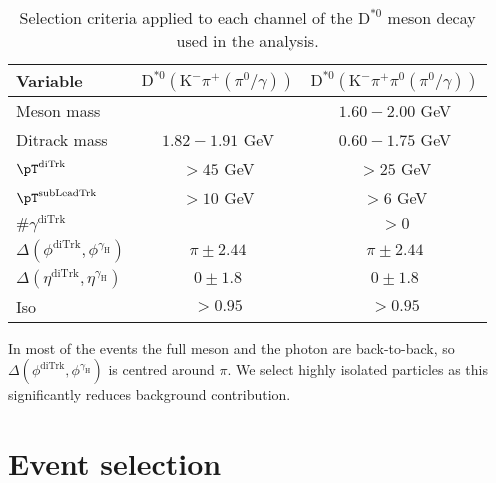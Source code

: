\begin{table}[!ht]
    \centering
    \begin{tabular}{|l|c|c|}
        \hline
        \cellcolor{lightgray}Variable & \cellcolor{lightgray}$\text{D}^{*0}(\text{K}^{-}\pi^{+}{\scriptstyle(\pi^{0}/\gamma)})$ & \cellcolor{lightgray}$\text{D}^{*0}(\text{K}^{-}\pi^{+}\pi^{0}{\scriptstyle(\pi^{0}/\gamma)})$ \\ \hline
        Meson mass                                              &                   &$1.60-2.00$ GeV  \\
        Ditrack mass                                            &$1.82-1.91$ GeV    &$0.60-1.75$ GeV  \\
        $\pT^{\text{diTrk}}$                                    &$>45$ GeV          &$>25$ GeV           \\
        $\pT^{\text{subLeadTrk}}$                               &$>10$ GeV          &$>6$ GeV           \\
        $\#\gamma^{\text{diTrk}}$                               &                   &$>0$               \\
        $\Delta(\phi^{\text{diTrk}}, \phi^{\gamma_\text{H}})$   &$\pi\pm2.44$       &$\pi\pm2.44$        \\
        $\Delta(\eta^{\text{diTrk}}, \eta^{\gamma_\text{H}})$   &$0\pm1.8$          &$0\pm1.8$           \\
        Iso                                                     &$>0.95$            &$>0.95$             \\
        \hline
        \end{tabular}
    \caption{Selection criteria applied to each channel of the $\text{D}^{*0}$ meson decay used in the analysis.}
    \label{tab:meson_selection_2}
\end{table}

In most of the events the full meson and the photon are back-to-back, so $\Delta(\phi^{\text{diTrk}}, \phi^{\gamma_\text{H}})$ is centred around $\pi$. We select highly isolated particles as this significantly reduces background contribution.

\section{Event selection}\label{sec:event_selection}

